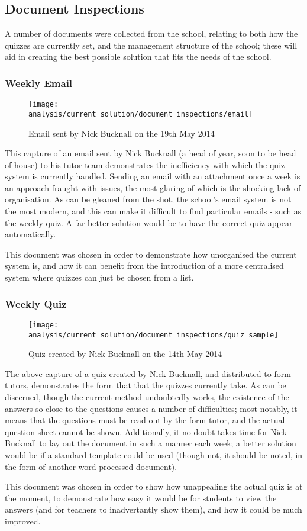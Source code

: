 \subsection{Document Inspections}

A number of documents were collected from the school, relating to both how the quizzes are currently set, and the management structure of the school; these will aid in creating the best possible solution that fits the needs of the school.

\subsubsection{Weekly Email} %
\label{ssub:weekly_email}
\begin{figure}[h!]
  \texttt{[image: analysis/current\_solution/document\_inspections/email]}
  \caption{Email sent by Nick Bucknall on the 19th May 2014}
\end{figure}

This capture of an email sent by Nick Bucknall (a head of year, soon to be head of house) to his tutor team demonstrates the inefficiency with which the quiz system is currently handled. Sending an email with an attachment once a week is an approach fraught with issues, the most glaring of which is the shocking lack of organisation. As can be gleaned from the shot, the school's email system is not the most modern, and this can make it difficult to find particular emails - such as the weekly quiz. A far better solution would be to have the correct quiz appear automatically.

This document was chosen in order to demonstrate how unorganised the current system is, and how it can benefit from the introduction of a more centralised system where quizzes can just be chosen from a list.
\clearpage

\subsubsection{Weekly Quiz} %
\label{ssub:weekly_quiz}
\begin{figure}[h!]
  \texttt{[image: analysis/current\_solution/document\_inspections/quiz\_sample]}
  \caption{Quiz created by Nick Bucknall on the 14th May 2014}
\end{figure}

The above capture of a quiz created by Nick Bucknall, and distributed to form tutors, demonstrates the form that that the quizzes currently take. As can be discerned, though the current method undoubtedly works, the existence of the answers so close to the questions causes a number of difficulties; most notably, it means that the questions must be read out by the form tutor, and the actual question sheet cannot be shown. Additionally, it no doubt takes time for Nick Bucknall to lay out the document in such a manner each week; a better solution would be if a standard template could be used (though not, it should be noted, in the form of another word processed document).

This document was chosen in order to show how unappealing the actual quiz is at the moment, to demonstrate how easy it would be for students to view the answers (and for teachers to inadvertantly show them), and how it could be much improved.
\clearpage

